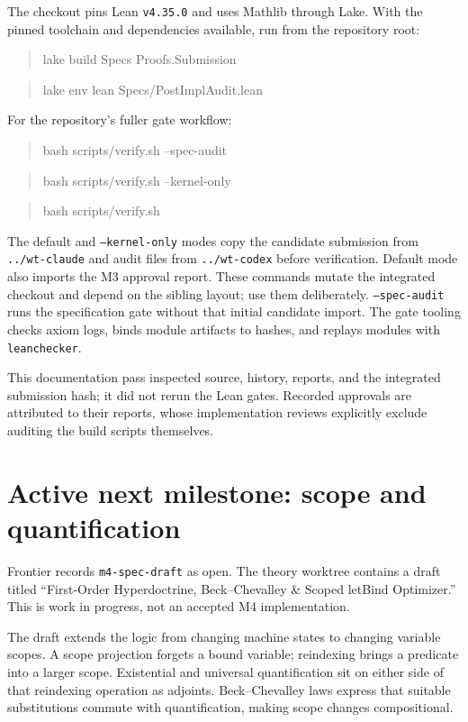 \documentclass[11pt]{article}
\begin{document}
The checkout pins Lean \texttt{v4.35.0} and uses Mathlib through Lake. With the pinned toolchain and dependencies available, run from the repository root:

\begin{quote}\small\ttfamily lake build Specs Proofs.Submission\end{quote}
\begin{quote}\small\ttfamily lake env lean Specs/PostImplAudit.lean\end{quote}

For the repository's fuller gate workflow:

\begin{quote}\small\ttfamily bash scripts/verify.sh --spec-audit\end{quote}
\begin{quote}\small\ttfamily bash scripts/verify.sh --kernel-only\end{quote}
\begin{quote}\small\ttfamily bash scripts/verify.sh\end{quote}

The default and \texttt{--kernel-only} modes copy the candidate submission from \texttt{../wt-claude} and audit files from \texttt{../wt-codex} before verification. Default mode also imports the M3 approval report. These commands mutate the integrated checkout and depend on the sibling layout; use them deliberately. \texttt{--spec-audit} runs the specification gate without that initial candidate import. The gate tooling checks axiom logs, binds module artifacts to hashes, and replays modules with \texttt{leanchecker}.

This documentation pass inspected source, history, reports, and the integrated submission hash; it did not rerun the Lean gates. Recorded approvals are attributed to their reports, whose implementation reviews explicitly exclude auditing the build scripts themselves.

\section*{Active next milestone: scope and quantification}

Frontier records \texttt{m4-spec-draft} as open. The theory worktree contains a draft titled “First-Order Hyperdoctrine, Beck--Chevalley \& Scoped letBind Optimizer.” This is work in progress, not an accepted M4 implementation.

The draft extends the logic from changing machine states to changing variable scopes. A scope projection forgets a bound variable; reindexing brings a predicate into a larger scope. Existential and universal quantification sit on either side of that reindexing operation as adjoints. Beck--Chevalley laws express that suitable substitutions commute with quantification, making scope changes compositional.
\end{document}
